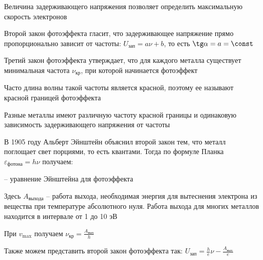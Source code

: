 Величина задерживающего напряжения позволяет определить максимальную скорость электронов

Второй закон фотоэффекта гласит, что задерживающее напряжение прямо пропорционально зависит от частоты: $U_\text{зап} = a\nu + b$, то есть $\tg \alpha = a = \const$

Третий закон фотоэффекта утверждает, что для каждого металла существует минимальная частота $\nu_{\text{кр}}$, при которой начинается фотоэффект

Часто длина волны такой частоты является красной, поэтому ее называют красной границей фотоэффекта

Разные металлы имеют различную частоту красной границы и одинаковую зависимость задерживающего напряжения от частоты

\mediumvspace

В 1905 году Альберт Эйнштейн объяснил второй закон тем, что металл поглощает свет порциями, то есть квантами. Тогда по формуле Планка $\varepsilon_{\text{фотона}} = h \nu$ получаем:

 -- уравнение Эйнштейна для фотоэффекта

\smallvspace

Здесь $A_{\text{выхода}}$ -- работа выхода, необходимая энергия для вытеснения электрона из вещества при температуре абсолютного нуля. Работа выхода для многих металлов находится в интервале от 1 до 10 эВ

При $v_{\max}$ получаем $\nu_\text{кр} = \frac{A_\text{вых}}{h}$

Также можем представить второй закон фотоэффекта так: $U_\text{зап} = \frac{h}{e} \nu - \frac{A_\text{вых}}{e}$
